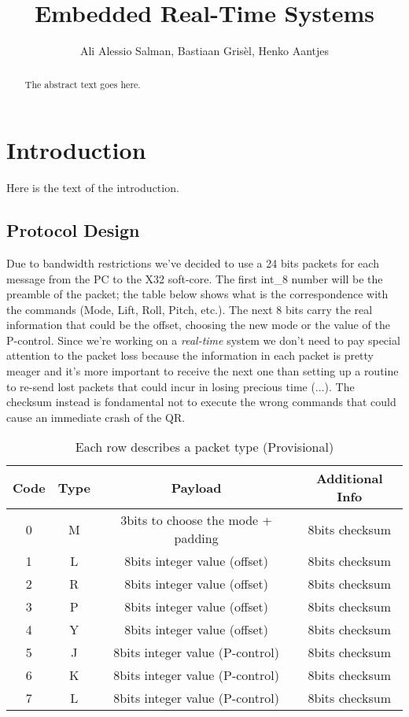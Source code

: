 \documentclass{article}
\begin{document}
\title{\textbf{Embedded Real-Time Systems}}
\author{Ali Alessio Salman, Bastiaan Grisèl, Henko Aantjes}

\maketitle

\begin{abstract}
\begin{center}
The abstract text goes here. 
\end{center}
\end{abstract}

\section{Introduction}
Here is the text of the introduction.

\subsection{Protocol Design}
\justifying
Due to bandwidth restrictions we've decided to use a 24 bits packets for each message from the PC to the X32 soft-core. The first int\_8 number will be the preamble of the packet; the table below shows what is the correspondence with the commands (Mode, Lift, Roll, Pitch, etc.). The next 8 bits carry the real information that could be the offset, choosing the new mode or the value of the P-control.  
Since we're working on a \textit{real-time} system we don't need to pay special attention to the packet loss because the information in each packet is pretty meager and it's more important to receive the next one than setting up a routine to re-send lost packets that could incur in losing precious time (...).  
The checksum instead is fondamental not to execute the wrong commands that could cause an immediate crash of the QR. 
\vspace{2em}


\begin{table}[h!]
\centering
 \begin{tabular}{||c|c|c|c||} 
 \hline
 Code & Type & Payload & Additional Info \\ [0.5ex] 
 \hline\hline
 0 & M & 3bits to choose the mode + padding & 8bits checksum \\ 
 \hline
 1 & L & 8bits integer value (offset) & 8bits checksum \\
 \hline
 2 & R & 8bits integer value (offset) & 8bits checksum \\
 \hline
 3 & P & 8bits integer value (offset) & 8bits checksum \\
 \hline
 4 & Y & 8bits integer value (offset) & 8bits checksum\\ 
 \hline
 5 & J & 8bits integer value (P-control) & 8bits checksum\\ 
 \hline
 6 & K & 8bits integer value (P-control) & 8bits checksum\\ 
 \hline
 7 & L & 8bits integer value (P-control) & 8bits checksum\\ 
 \hline
\end{tabular}
\caption{Each row describes a packet type (Provisional)}
\label{table:1}
\end{table}
\end{document}
